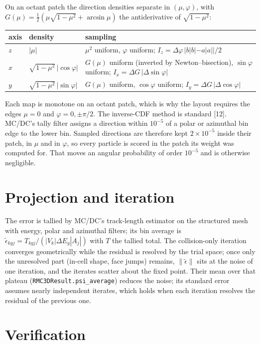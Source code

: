 \documentclass[11pt]{article}
\newcommand{\teps}{\tilde\epsilon}
\begin{document}
On an octant patch the direction densities separate in $(\mu,\varphi)$, with
$G(\mu)=\tfrac12(\mu\sqrt{1-\mu^2}+\arcsin\mu)$ the antiderivative of
$\sqrt{1-\mu^2}$:
\begin{center}
\begin{tabular}{lll}
\toprule
axis & density & sampling \\
\midrule
$z$ & $|\mu|$ & $\mu^2$ uniform, $\varphi$ uniform;
$I_z = \Delta\varphi\,|b|b|-a|a||/2$ \\
$x$ & $\sqrt{1-\mu^2}\,|\cos\varphi|$ & $G(\mu)$ uniform (inverted by
Newton--bisection), $\sin\varphi$ uniform; $I_x = \Delta G\,|\Delta\sin\varphi|$ \\
$y$ & $\sqrt{1-\mu^2}\,|\sin\varphi|$ & $G(\mu)$ uniform, $\cos\varphi$ uniform;
$I_y = \Delta G\,|\Delta\cos\varphi|$ \\
\bottomrule
\end{tabular}
\end{center}
Each map is monotone on an octant patch, which is why the layout requires the edges
$\mu=0$ and $\varphi=0,\pm\pi/2$. The inverse-CDF method is standard [12].
MC/DC's tally filter assigns a direction within $10^{-5}$ of a polar or azimuthal bin
edge to the lower bin. Sampled directions are therefore kept $2\times10^{-5}$ inside
their patch, in $\mu$ and in $\varphi$, so every particle is scored in the patch its
weight was computed for. That moves an angular probability of order $10^{-5}$ and is
otherwise negligible.

\section{Projection and iteration}

The error is tallied by MC/DC's track-length estimator on the structured mesh with
energy, polar and azimuthal filters; its bin average is
$\teps_{kgj} = T_{kgj}/(|V_k|\Delta E_g|A_j|)$ with $T$ the tallied total. The
collision-only iteration converges geometrically while the residual is resolved by
the trial space; once only the unresolved part (in-cell shape, face jumps) remains,
$\|\teps\|$ sits at the noise of one iteration, and the iterates scatter about the
fixed point. Their mean over that plateau (\texttt{RMC3DResult.psi\_average})
reduces the noise; its standard error assumes nearly independent iterates, which
holds when each iteration resolves the residual of the previous one.

\section{Verification}
\end{document}
